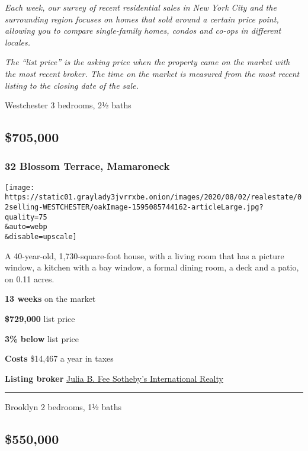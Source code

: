 \emph{Each week, our survey of recent residential sales in New York City
and the surrounding region focuses on homes that sold around a certain
price point, allowing you to compare single-family homes, condos and
co-ops in different locales.}

\emph{The ``list price'' is the asking price when the property came on
the market with the most recent broker. The time on the market is
measured from the most recent listing to the closing date of the sale.}

Westchester \textbar{} 3 bedrooms, 2½ baths

\hypertarget{705000}{%
\subsection{\$705,000}\label{705000}}

\hypertarget{32-blossom-terrace-mamaroneck}{%
\subsubsection{\texorpdfstring{\textbf{32 Blossom Terrace,
Mamaroneck}}{32 Blossom Terrace, Mamaroneck}}\label{32-blossom-terrace-mamaroneck}}

\texttt{[image: https://static01.graylady3jvrrxbe.onion/images/2020/08/02/realestate/02selling-WESTCHESTER/oakImage-1595085744162-articleLarge.jpg?quality=75\\\&auto=webp\\\&disable=upscale]}

A 40-year-old, 1,730-square-foot house, with a living room that has a
picture window, a kitchen with a bay window, a formal dining room, a
deck and a patio, on 0.11 acres.

\textbf{13 weeks} on the market

\textbf{\$729,000} list price

\textbf{3\% below} list price

\textbf{Costs} \$14,467 a year in taxes

\textbf{Listing broker}
\href{https://www.williampitt.com/search/real-estate-sales/32-blossom-terrace-larchmont-ny-10538-6002521-2305389/}{Julia
B. Fee Sotheby's International Realty}

\begin{center}\rule{0.5\linewidth}{\linethickness}\end{center}

Brooklyn \textbar{} 2 bedrooms, 1½ baths

\hypertarget{550000}{%
\subsection{\$550,000}\label{550000}}

